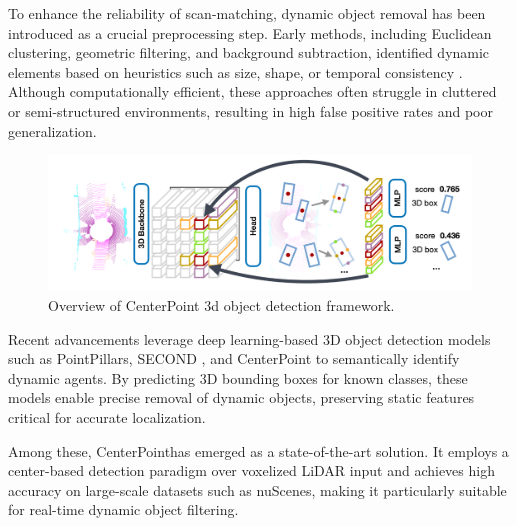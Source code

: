 To enhance the reliability of scan-matching, dynamic object removal has been introduced as a crucial preprocessing step. Early methods, including Euclidean clustering, geometric filtering, and background subtraction, identified dynamic elements based on heuristics such as size, shape, or temporal consistency \cite{liu2019segmentation,koide2019portable} . Although computationally efficient, these approaches often struggle in cluttered or semi-structured environments, resulting in high false positive rates and poor generalization.
\begin{figure}
	\centering
	\includegraphics[width=1
	\linewidth]{images/center_point2.png}
	\caption{Overview of CenterPoint 3d object detection framework.  \cite{yin2021center}}
	\label{fig:Overview-CenterPoint }
\end{figure}
Recent advancements leverage deep learning-based 3D object detection models such as PointPillars\cite{lang2019pointpillars}, SECOND \cite{yan2018second}, and CenterPoint \cite{yin2021center} to semantically identify dynamic agents. By predicting 3D bounding boxes for known classes, these models enable precise removal of dynamic objects, preserving static features critical for accurate localization.

Among these, CenterPoint\cite{yin2021center}has emerged as a state-of-the-art solution. It employs a center-based detection paradigm over voxelized LiDAR input and achieves high accuracy on large-scale datasets such as nuScenes\cite{caesar2020nuscenes}, making it particularly suitable for real-time dynamic object filtering.

